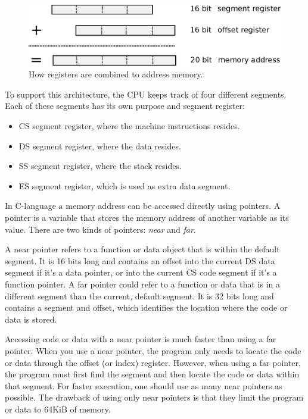 \documentclass[book.tex]{subfiles}
\begin{document}
\par
\begin{figure}[H]
\centering
\includegraphics[width=\textwidth]{imgs/drawings/register_combination_20_bits_address.eps}
\caption{How registers are combined to address memory.}
\label{fig:register_comb_to_20_bits}
\end{figure}
\par

To support this architecture, the CPU keeps track of four different segments. Each of these segments has its own purpose and segment register:
\begin{itemize}
  \item CS segment register, where the machine instructions resides.
  \item DS segment register, where the data resides.
  \item SS segment register, where the stack resides.
  \item ES segment register, which is used as extra data segment.
\end{itemize}

\par
In C-language a memory address can be accessed directly using pointers. A pointer is a variable that stores the memory address of another variable as its value. There are two kinds of pointers: \textit{near} and \textit{far}. \\

\par
A near pointer refers to a function or data object that is within the default segment. It is 16 bits long and contains an offset into the current DS data segment if it's a data pointer, or into the current CS code segment if it's a function pointer. A far pointer could refer to a function or data that is in a different segment than the current, default segment. It is 32 bits long and contains a segment and offset, which identifies the location where the code or data is stored. \\

\par
Accessing code or data with a near pointer is much faster than using a far pointer. When you use a near pointer, the program only needs to locate the code or data through the offset (or index) register. However, when using a far pointer, the program must first find the segment and then locate the code or data within that segment. For faster execution, one should use as many near pointers as possible. The drawback of using only near pointers is that they limit the program or data to 64KiB of memory.\\
\end{document}
